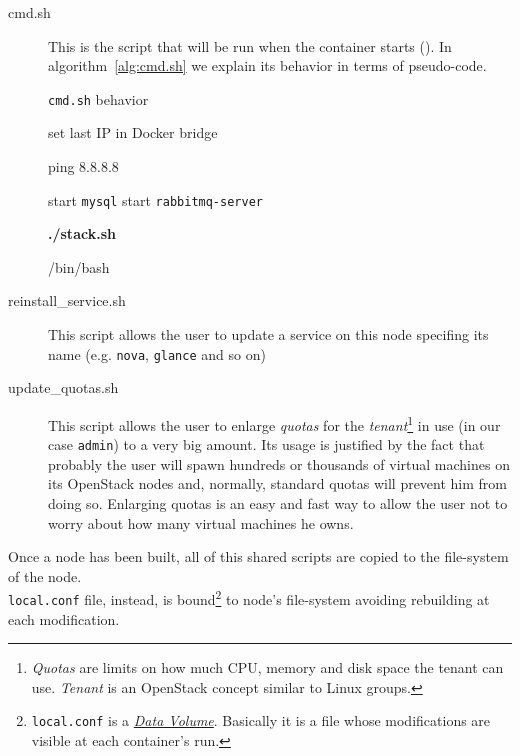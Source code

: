 \begin{description}
	\item[cmd.sh] This is the script that will be run when the container starts (). In algorithm~\ref{alg:cmd.sh} we explain its behavior in terms of pseudo-code.
	\begin{algorithm}[H]
	\caption{\texttt{cmd.sh} behavior}
	\label{alg:cmd.sh}
	\begin{algorithmic}[0]
			\State set last IP in Docker bridge 
		\EndIf

		\State ping 8.8.8.8 

			\State start \texttt{mysql}
			\State start \texttt{rabbitmq-server}
		\EndIf

		\State \textbf{./stack.sh} 

		\State /bin/bash 
	\end{algorithmic}
	\end{algorithm}
	
	\item[reinstall\_service.sh] This script allows the user to update a service on this node specifing its name (e.g. \texttt{nova}, \texttt{glance} and so on)

	\item[update\_quotas.sh] This script allows the user to enlarge \textit{quotas} for the \textit{tenant}\footnote{\textit{Quotas} are limits on how much CPU, memory and disk space the tenant can use. \textit{Tenant} is an OpenStack concept similar to Linux groups.} in use (in our case \texttt{admin}) to a very big amount. Its usage is justified by the fact that probably the user will spawn hundreds or thousands of virtual machines on its OpenStack nodes and, normally, standard quotas will prevent him from doing so. Enlarging quotas is an easy and fast way to allow the user not to worry about how many virtual machines he owns.
\end{description}

Once a node has been built, all of this shared scripts are copied to the file-system of the node.\\
\texttt{local.conf} file, instead, is bound\footnote{\texttt{local.conf} is a \href{https://docs.docker.com/userguide/dockervolumes/\#data-volumes}{\textit{Data Volume}}. Basically it is a file whose modifications are visible at each container's run.} to node's file-system avoiding rebuilding at each modification.

